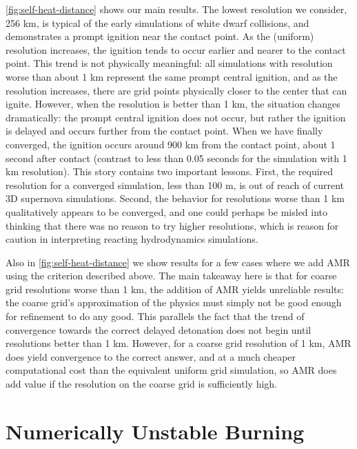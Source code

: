 \documentclass[twocolumn,numberedappendix]{../aastex62}
\begin{document}
\autoref{fig:self-heat-distance} shows our main results. The lowest resolution we consider,
256 km, is typical of the early simulations of white dwarf collisions, and demonstrates a
prompt ignition near the contact point. As the (uniform) resolution increases, the ignition
tends to occur earlier and nearer to the contact point. This trend is not physically meaningful:
all simulations with resolution worse than about 1 km represent the same prompt central ignition,
and as the resolution increases, there are grid points physically closer to the center that can ignite.
However, when the resolution is better than 1 km, the situation changes dramatically: the prompt
central ignition does not occur, but rather the ignition is delayed and occurs further from the contact
point. When we have finally converged, the ignition occurs around 900 km from the contact point,
about 1 second after contact (contrast to less than 0.05 seconds for the simulation with 1 km resolution).
This story contains two important lessons. First, the required resolution for a converged simulation,
less than 100 m, is out of reach of current 3D supernova simulations. Second, the behavior for
resolutions worse than 1 km qualitatively appears to be converged, and one could perhaps
be misled into thinking that there was no reason to try higher resolutions, which is reason
for caution in interpreting reacting hydrodynamics simulations.

Also in \autoref{fig:self-heat-distance} we show results for a few cases where we add AMR
using the criterion described above. The main takeaway here is that for coarse grid resolutions
worse than 1 km, the addition of AMR yields unreliable results: the coarse grid's approximation
of the physics must simply not be good enough for refinement to do any good. This parallels the
fact that the trend of convergence towards the correct delayed detonation does not begin until
resolutions better than 1 km. However, for a coarse grid resolution of 1 km, AMR does yield
convergence to the correct answer, and at a much cheaper computational cost than the equivalent
uniform grid simulation, so AMR does add value if the resolution on the
coarse grid is sufficiently high.



\section{Numerically Unstable Burning}
\label{sec:unstable_burning}
\end{document}
